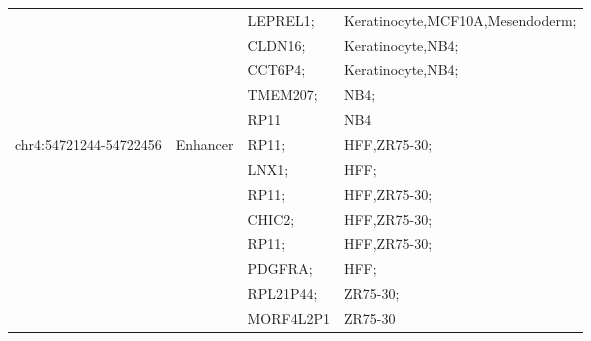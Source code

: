 \begin{table}[]
\begin{tabularx}{\textwidth}{lllX}
                                               &                            & LEPREL1;    & Keratinocyte,MCF10A,Mesendoderm;                                                \\
                                               &                            & CLDN16;     & Keratinocyte,NB4;                                                               \\
                                               &                            & CCT6P4;     & Keratinocyte,NB4;                                                               \\
                                               &                            & TMEM207;    & NB4;                                                                            \\
                                               &                            & RP11        & NB4                                                                             \\
    \multirow{8}{*}{chr4:54721244-54722456}    & \multirow{8}{*}{Enhancer}  & RP11;       & HFF,ZR75-30;                                                                    \\
                                               &                            & LNX1;       & HFF;                                                                            \\
                                               &                            & RP11;       & HFF,ZR75-30;                                                                    \\
                                               &                            & CHIC2;      & HFF,ZR75-30;                                                                    \\
                                               &                            & RP11;       & HFF,ZR75-30;                                                                    \\
                                               &                            & PDGFRA;     & HFF;                                                                            \\
                                               &                            & RPL21P44;   & ZR75-30;                                                                        \\
                                               &                            & MORF4L2P1   & ZR75-30                                                                         \\

\end{tabularx}
\end{table}
